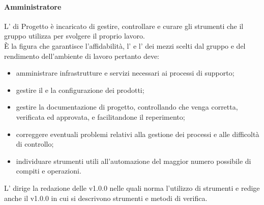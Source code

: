             \paragraph{Amministratore }
                L’ di Progetto è incaricato di gestire, controllare e curare gli strumenti che il gruppo utilizza per svolgere il proprio lavoro. \\
                È la figura che garantisce l’affidabilità, l’ e l' dei mezzi scelti dal gruppo e del rendimento dell’ambiente di lavoro pertanto deve:\\
                \begin{itemize}
                    \item amministrare infrastrutture e servizi necessari ai processi di supporto;
                    \item gestire il  e la configurazione dei prodotti;
                    \item gestire la documentazione di progetto, controllando che venga corretta, verificata ed approvata, e facilitandone il reperimento;
                    \item correggere eventuali problemi relativi alla gestione dei processi e alle difficoltà di controllo;
                    \item individuare strumenti utili all’automazione del maggior numero possibile di compiti e operazioni.
                \end{itemize}
                L’ dirige la redazione delle  v1.0.0 nelle quali norma l’utilizzo di strumenti e redige anche il  v1.0.0 in cui si descrivono strumenti e metodi di verifica.
